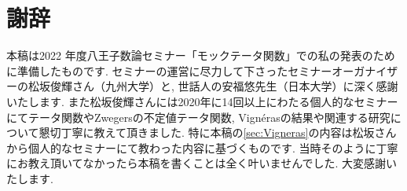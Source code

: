 \documentclass[11pt,b5paper,oneside,lualatex]{ltjsarticle} %
\numberwithin{equation}{section} %
\begin{document}











\section*{謝辞}


本稿は2022 年度八王子数論セミナー「モックテータ関数」での私の発表のために準備したものです. 
セミナーの運営に尽力して下さったセミナーオーガナイザーの松坂俊輝さん（九州大学）と, 世話人の安福悠先生（日本大学）に深く感謝いたします. 
また松坂俊輝さんには2020年に14回以上にわたる個人的なセミナーにてテータ関数やZwegersの不定値テータ関数, Vign\'{e}rasの結果や関連する研究について懇切丁寧に教えて頂きました. 
特に本稿の\cref{sec:Vigneras}の内容は松坂さんから個人的なセミナーにて教わった内容に基づくものです. 
当時そのように丁寧にお教え頂いてなかったら本稿を書くことは全く叶いませんでした. 
大変感謝いたします. 






\end{document}
